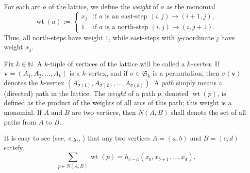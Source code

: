 \documentclass[reqno]{amsart}
\newcommand{\0}{\phantom{c}}
\newcommand{\SymGp}[1]{\mathfrak{S}_{#1}} %
\DeclareMathOperator{\wt}{wt} %
\newcommand{\vv}{\mathbf{v}}
\newcommand{\NN}{\mathbb{N}}
\let\sumnonlimits\sum
\renewcommand{\sum}{\sumnonlimits\limits}
\newenvironment{verlong}{}{}
\newcommand{\tup}[1]{\left( #1 \right)}
\newcommand{\defn}[1]{{\color{darkred}\emph{#1}}} %
\theoremstyle{plain}
\theoremstyle{definition}
\numberwithin{equation}{section}
\begin{document}
For each arc $a$ of the lattice, we define the \defn{weight} of $a$ as the monomial
\[
\wt(a) :=
\begin{cases}
x_j & \text{if $a$ is an east-step } (i,j) \to (i+1,j), \\
1 & \text{if $a$ is a north-step } (i,j) \to (i,j+1).
\end{cases}
\]
Thus, all north-steps have weight $1$, while east-steps with $y$-coordinate $j$ have weight $x_j$.

Fix $k \in \NN$.
A $k$-tuple of vertices of the lattice will be called a \defn{$k$-vertex}.
\begin{verlong}
If $\vv = \tup{A_1, A_2, \dotsc, A_k}$ is a $k$-vertex, and if $\sigma \in \SymGp{k}$ is a permutation, then $\sigma(\vv)$ denotes the $k$-vertex $\tup{A_{\sigma(1)}, A_{\sigma(2)}, \dotsc, A_{\sigma(k)}}$.
\end{verlong}
A \defn{path} simply means a (directed) path in the lattice.
The \defn{weight} of a path $p$, denoted $\wt(p)$, is defined as the product of the weights of all arcs of this path; this weight is a monomial.
If $A$ and $B$ are two vertices, then \defn{$N(A,B)$} shall denote the set of all paths from $A$ to $B$.

It is easy to see (see, \textit{e.g.}, \cite[(2.36)]{Stanley-EC1}) that any two vertices $A = (a,b)$ and $B = (c,d)$ satisfy
\begin{equation}
\label{eq.LGV.single-paths}
\sum_{p \in N(A,B)} \wt(p) = h_{c-a}(x_{b}, x_{b+1}, \dotsc, x_{d}).
\end{equation}
\end{document}
